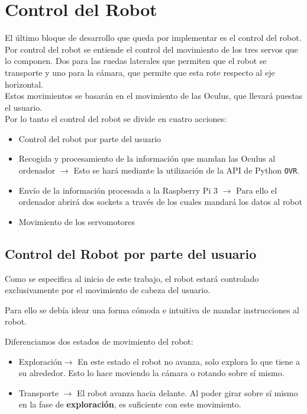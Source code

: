 \documentclass[twoside, 11pt]{epstfg}
\begin{document}
\section{Control del Robot}
El último bloque de desarrollo que queda por implementar es el control del robot. Por control del robot se entiende el control del movimiento de los tres servos que lo componen. Dos para las ruedas laterales que permiten que el robot se transporte y uno para la cámara, que permite que esta rote respecto al eje horizontal.\\
Estos movimientos se basarán en el movimiento de las Oculus, que llevará puestas el usuario.\\
Por lo tanto el control del robot se divide en cuatro acciones:
\begin{itemize}
	\item Control del robot por parte del usuario
	\item Recogida y procesamiento de la información que mandan las Oculus al ordenador $\rightarrow$ Esto se hará mediante la utilización de la API de Python \texttt{OVR}.
	
	\item Envío de la información procesada a la Raspberry Pi 3 $\rightarrow$ Para ello el ordenador abrirá dos sockets a través de los cuales mandará los datos al robot
	
	\item Movimiento de los servomotores
\end{itemize}


\subsection{Control del Robot por parte del usuario}\label{intCont}

Como se especifica al inicio de este trabajo, el robot estará controlado exclusivamente por el movimiento de cabeza del usuario.

Para ello se debía idear una forma cómoda e intuitiva de mandar instrucciones al robot.

Diferenciamos dos estados de movimiento del robot:
\begin{itemize}
	\item Exploración$\rightarrow$ En este estado el robot no avanza, solo explora lo que tiene a su alrededor. Esto lo hace moviendo la cámara o rotando sobre sí mismo.
	\item Transporte $\rightarrow$ El robot avanza hacia delante. Al poder girar sobre sí mismo en la fase de \textbf{exploración}, es suficiente con este movimiento.
\end{itemize}
\end{document}
